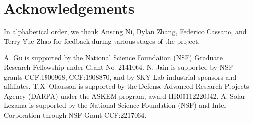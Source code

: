 \section{Acknowledgements}
In alphabetical order, we thank Ansong Ni, Dylan Zhang, Federico Cassano, and Terry Yue Zhao for feedback during various stages of the project.

A. Gu is supported by the National Science Foundation (NSF) Graduate Research Fellowship under Grant No. 2141064. 
N. Jain is supported by NSF grants CCF:1900968, CCF:1908870, and by SKY Lab industrial sponsors and affiliates. 
T.X. Olausson is supported by the Defense Advanced Research Projects Agency (DARPA) under the ASKEM program, award HR00112220042. 
A. Solar-Lezama is supported by the National Science Foundation (NSF) and Intel Corporation through NSF Grant CCF:2217064.